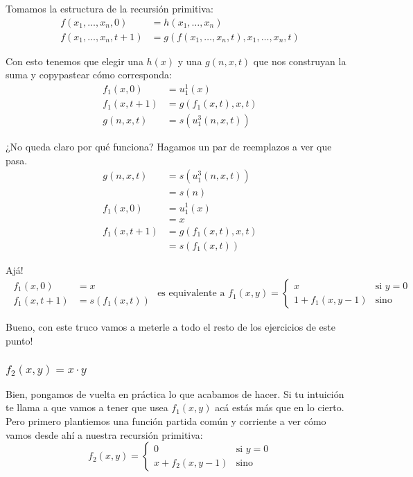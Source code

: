 \documentclass[fleqn, 11pt]{article}
\begin{document}
Tomamos la estructura de la recursión primitiva:
\begin{align*}
	f(x_1, \dots, x_n, 0)     &= h(x_1, \dots, x_n) \\
	f(x_1, \dots, x_n, t + 1) &= g(f(x_1, \dots, x_n, t), x_1, \dots, x_n,
	t)
\end{align*}

Con esto tenemos que elegir una $h(x)$ y una $g(n, x, t)$ que nos construyan la
suma y copypastear cómo corresponda:
\begin{align*}
	f_1(x, 0)     &= u^1_1(x) \\
	f_1(x, t + 1) &= g(f_1(x, t), x, t) \\
	g(n, x, t)    &= s(u^3_1(n, x, t))
\end{align*}

¿No queda claro por qué funciona? Hagamos un par de reemplazos a ver que pasa.
\begin{align*}
	g(n, x, t)    &= s(u^3_1(n, x, t)) \\
	&= s(n) \\
	f_1(x, 0)     &= u^1_1(x) \\
	&= x \\
	f_1(x, t + 1) &= g(f_1(x, t), x, t) \\
	&= s(f_1(x, t))
\end{align*}

Ajá!
\begin{gather*}
	\begin{aligned}
		f_1(x, 0)     &= x \\
		f_1(x, t + 1) &= s(f_1(x, t))
	\end{aligned}
	\text{\ es equivalente a }
	f_1(x, y) = 
	\begin{cases}
		x                 & \text{si } y = 0 \\
		1 + f_1(x, y - 1) & \text{sino}
	\end{cases}
\end{gather*}

Bueno, con este truco vamos a meterle a todo el resto de los ejercicios de este
punto!

\subsubsection{$f_2(x, y) = x \cdot y$}

Bien, pongamos de vuelta en práctica lo que acabamos de hacer. Si tu intuición
te llama a que vamos a tener que usea $f_1(x, y)$ acá estás más que en lo
cierto. Pero primero plantiemos una función partida común y corriente a ver
cómo vamos desde ahí a nuestra recursión primitiva:
\begin{equation*}
	f_2(x, y) = 
	\begin{cases}
		0                 & \text{si } y = 0 \\
		x + f_2(x, y - 1) & \text{sino}
	\end{cases}
\end{equation*}
\end{document}
